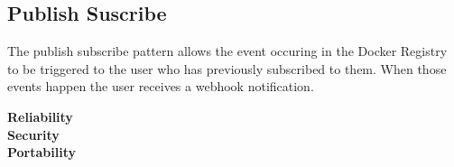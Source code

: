 \subsection{Publish Suscribe}

The publish subscribe pattern allows the event occuring in the Docker Registry to be triggered to the user who has previously subscribed to them. When those events happen the user receives a webhook notification.

\textbf{Reliability} \\
\textbf{Security} \\
\textbf{Portability} \\

